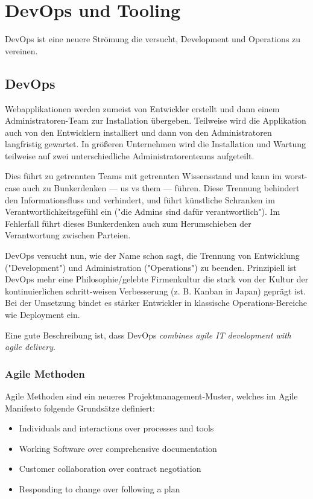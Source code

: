 \chapter{DevOps und Tooling}

DevOps ist eine neuere Strömung die versucht, Development und Operations zu vereinen.

\section{DevOps}

Webapplikationen werden zumeist von Entwickler erstellt und dann einem Administratoren-Team zur Installation übergeben. Teilweise wird die Applikation auch von den Entwicklern installiert und dann von den Administratoren langfristig gewartet. In größeren Unternehmen wird die Installation und Wartung teilweise auf zwei unterschiedliche Administratorenteams aufgeteilt.

Dies führt zu getrennten Teams mit getrennten Wissensstand und kann im worst-case auch zu Bunkerdenken --- us vs them --- führen. Diese Trennung behindert den Informationsfluss und verhindert, und führt künstliche Schranken im Verantwortlichkeitsgefühl ein ("die Admins sind dafür verantwortlich"). Im Fehlerfall führt dieses Bunkerdenken auch zum Herumschieben der Verantwortung zwischen Parteien.

DevOps versucht nun, wie der Name schon sagt, die Trennung von Entwicklung ("Development") und Administration ("Operations") zu beenden. Prinzipiell ist DevOps mehr eine Philosophie/gelebte Firmenkultur die stark von der Kultur der kontinuierlichen schritt-weisen Verbesserung (z. B. Kanban in Japan) geprägt ist. Bei der Umsetzung bindet es stärker Entwickler in klassische Operations-Bereiche wie Deployment ein.

Eine gute Beschreibung ist, dass DevOps \textit{combines agile IT development with agile delivery}.

\subsection{Agile Methoden}

Agile Methoden sind ein neueres Projektmanagement-Muster, welches im Agile Manifesto folgende Grundsätze definiert:

\begin{itemize}
	\item Individuals and interactions over processes and tools
	\item Working Software over comprehensive documentation
	\item Customer collaboration over contract negotiation
	\item Responding to change over following a plan
\end{itemize}

